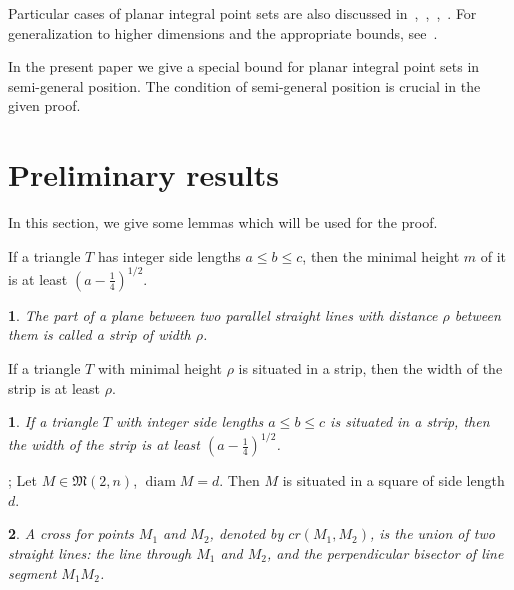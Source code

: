 \documentclass[11pt,twoside,draft
]{article}
\newtheorem{Definition}{\indent {\sc Definition}}
\newtheorem{Corollary}{\indent {\sc Corollary}}
\begin{document}
Particular cases of planar integral point sets are also discussed
in~\cite[\S 5.11]{brass2006research},~\cite[\S D20]{guy2013unsolved},~\cite{our-pmm-2018},~\cite{our-ped-2018}.
For generalization to higher dimensions and the appropriate bounds, see~\cite{kurz2005characteristic,nozaki2013lower}.

In the present paper we give a special bound for planar integral point sets in semi-general position.
The condition of semi-general position is crucial in the given proof.



\section{Preliminary results}

In this section, we give some lemmas which will be used for the proof.


\begin{lemma}
	\cite[Observation 1]{solymosi2003note}
	If a triangle $T$ has integer side lengths $a \leq b \leq c$,
	then the minimal height $m$ of it is at least $\left(a - \frac{1}{4}\right)^{1/2}$.
\end{lemma}

\begin{Definition}
	The part of a plane between two parallel straight lines with distance $\rho$ between them
	is called a strip of width $\rho$.
\end{Definition}

\begin{lemma}
	\cite{smurov1998stripcoverings}
	If a triangle $T$ with minimal height $\rho$ is situated in a strip,
	then the width of the strip is at least $\rho$.
\end{lemma}

\begin{Corollary}
	\label{cor:solymosi_strip}
	If a triangle $T$ with integer side lengths $a \leq b \leq c$ is situated in a strip,
	then the width of the strip is at least $\left(a - \frac{1}{4}\right)^{1/2}$.
\end{Corollary}


\begin{lemma}
	\cite[Lemma 4]{our-vmmsh-2018};
	\cite[Lemma 2.4]{my-pps-linear-bound-2019}
	\label{lem:square_container}
	Let $M\in\mathfrak{M}(2,n)$, $\operatorname{diam} M = d$.
	Then $M$ is situated in a square of side length $d$.
\end{lemma}

\begin{Definition}
	\cite[Definition 2.5]{my-pps-linear-bound-2019}
	A \textit{cross} for points $M_1$ and $M_2$, denoted by $cr(M_1,M_2)$, is the union of two straight lines:
	the line through $M_1$ and $M_2$,
	and the perpendicular bisector of line segment $M_1 M_2$.
\end{Definition}
\end{document}
